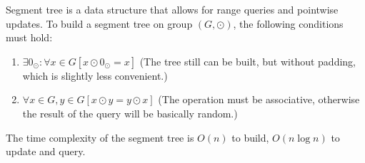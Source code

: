 Segment tree is a data structure that allows for range queries and pointwise updates. To build a segment tree on group $(G, \odot)$, the following conditions must hold:
\begin{enumerate}
  \item $\exists 0_{\odot}: \forall x \in G \left[ x \odot 0_{\odot} = x \right]$ (The tree still can be built, but without padding, which is slightly less convenient.)
  \item $\forall x \in G, y \in G \left[ x \odot y = y \odot x \right]$ (The operation must be associative, otherwise the result of the query will be basically random.)
\end{enumerate}
The time complexity of the segment tree is $O(n)$ to build, $O(n \log n)$ to update and query.
\\ \\

